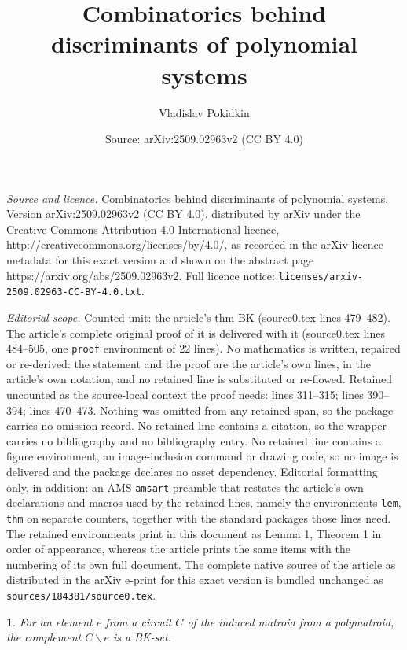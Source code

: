 \documentclass[10pt,a4paper]{amsart}
\title{Combinatorics behind discriminants of polynomial systems}
\author{Vladislav Pokidkin}
\date{Source: arXiv:2509.02963v2 (CC BY 4.0)}
\newtheorem{lem}{}
\begin{document}
\maketitle

\noindent\emph{Source and licence.} Combinatorics behind discriminants of polynomial systems. Version arXiv:2509.02963v2 (CC BY 4.0), distributed by arXiv under the Creative Commons Attribution 4.0 International licence, http://creativecommons.org/licenses/by/4.0/, as recorded in the arXiv licence metadata for this exact version and shown on the abstract page https://arxiv.org/abs/2509.02963v2. Full licence notice: \texttt{licenses/arxiv-2509.02963-CC-BY-4.0.txt}.\par\smallskip

\noindent\textit{Editorial scope.} Counted unit: the article's thm BK (source0.tex lines 479--482). The article's complete original proof of it is delivered with it (source0.tex lines 484--505, one \texttt{proof} environment of 22 lines). No mathematics is written, repaired or re-derived: the statement and the proof are the article's own lines, in the article's own notation, and no retained line is substituted or re-flowed.  Retained uncounted as the source-local context the proof needs: lines 311--315; lines 390--394; lines 470--473.  Nothing was omitted from any retained span, so the package carries no omission record.  No retained line contains a citation, so the wrapper carries no bibliography and no bibliography entry.  No retained line contains a figure environment, an image-inclusion command or drawing code, so no image is delivered and the package declares no asset dependency.  Editorial formatting only, in addition: an AMS \texttt{amsart} preamble that restates the article's own declarations and macros used by the retained lines, namely the environments \texttt{lem}, \texttt{thm} on separate counters, together with the standard packages those lines need.  The retained environments print in this document as Lemma 1, Theorem 1 in order of appearance, whereas the article prints the same items with the numbering of its own full document.  The complete native source of the article as distributed in the arXiv e-print for this exact version is bundled unchanged as \texttt{sources/184381/source0.tex}.
\begin{lem}
\label{Lemma. C=00005Ce is a BK-set}For an element $e$ from a circuit
$C$ of the induced matroid from a polymatroid, the complement $C\backslash e$
is a BK-set.
\end{lem}
\end{document}
